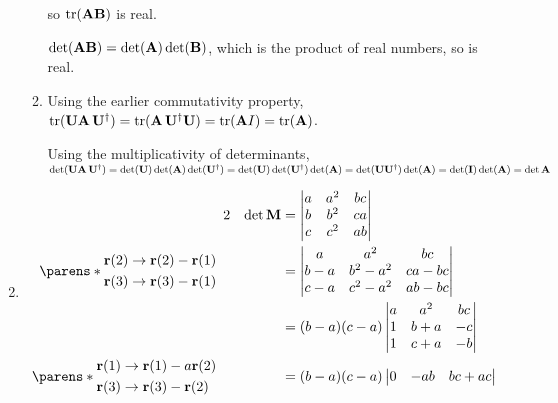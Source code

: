 \documentclass[fleqn,a4paper,11pt]{article}
\begin{document}
\begin{enumerate}[label=\textbf{\arabic*.}]
\begin{enumerate}[label=(\roman*)]
      so \(\operatorname{tr}(\mathbf{A}\mathbf{B})\) is real.

      \(\det(\mathbf{A}\mathbf{B}) = \det(\mathbf{A})\det(\mathbf{B})\), which is the product of
      real numbers, so is real.
     \item Using the earlier commutativity property,
      \(\operatorname{tr}(\mathbf{U}\mathbf{A}\,\mathbf{U}^\dag)
        = \operatorname{tr}(\mathbf{A}\,\mathbf{U}^\dag\mathbf{U}) = \operatorname{tr}(\mathbf{A}I) = \operatorname{tr}(\mathbf{A})\).

      Using the multiplicativity of determinants,
      \(\det(\mathbf{U}\mathbf{A}\,\mathbf{U}^\dag)
        = \det(\mathbf{U})\det(\mathbf{A})\det(\mathbf{U}^\dag)
        = \det(\mathbf{U})\det(\mathbf{U}^\dag)\det(\mathbf{A})
        = \det(\mathbf{U}\mathbf{U}^\dag)\det(\mathbf{A})
        = \det(\mathbf{I}) \det(\mathbf{A})
        = \det \mathbf{A}
        \)
   \end{enumerate}
  \item
   \begin{alignat*} 2
    && \det \mat M
     &= \begin{vmatrix}
      a & a^2 & bc \\
      b & b^2 & ca \\
      c & c^2 & ab
     \end{vmatrix} \\
    \parens*{
     \begin{aligned}
      \vec r(2) &\to \vec r(2) - \vec r(1) \\
      \vec r(3) &\to \vec r(3) - \vec r(1)
     \end{aligned}} \quad
    && &= \begin{vmatrix}
      a & a^2 & bc \\
      b - a & b^2 - a^2 & ca - bc \\
      c - a & c^2 - a^2 & ab - bc
     \end{vmatrix} \\
    && &= (b - a)(c - a)\begin{vmatrix}
      a & a^2 & bc \\
      1 & b + a & -c \\
      1 & c + a & -b
     \end{vmatrix} \\
    \parens*{
     \begin{aligned}
      \vec r(1) &\to \vec r(1) - a\vec r(2) \\
      \vec r(3) &\to \vec r(3) - \vec r(2)
     \end{aligned}} \quad
    && &= (b - a)(c - a)\begin{vmatrix}
      0 & -ab & bc + ac \\

\end{vmatrix}
\end{alignat*}
\end{enumerate}
\end{document}
